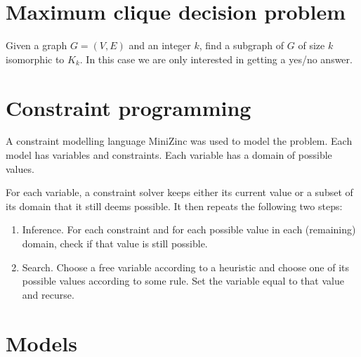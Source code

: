 \documentclass{article}
\begin{document}
\section{Maximum clique decision problem}
Given a graph $G=(V,E)$ and an integer $k$, find a subgraph of $G$ of size $k$ isomorphic to $K_k$. In this case we are only interested in getting a yes/no answer.
\section{Constraint programming}
A constraint modelling language MiniZinc was used to model the problem. Each model has variables and constraints. Each variable has a domain of possible values.

For each variable, a constraint solver keeps either its current value or a subset of its domain that it still deems possible. It then repeats the following two steps:
\begin{enumerate}
\item Inference. For each constraint and for each possible value in each (remaining) domain, check if that value is still possible.
\item Search. Choose a free variable according to a heuristic and choose one of its possible values according to some rule. Set the variable equal to that value and recurse.
\end{enumerate}
\section{Models}
\end{document}
